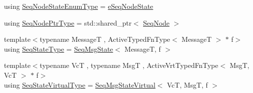 \begin{DoxyCompactItemize}
\item 
using \hyperlink{namespacevt_1_1seq_afe6bbf714bc77696f189e9321b981e46}{Seq\+Node\+State\+Enum\+Type} = \hyperlink{namespacevt_1_1seq_ad7b0496818667d816e00f717491d3b92}{e\+Seq\+Node\+State}
\item 
using \hyperlink{namespacevt_1_1seq_ae6a4874b585be0612aaca32ca6d2d191}{Seq\+Node\+Ptr\+Type} = std\+::shared\+\_\+ptr$<$ \hyperlink{structvt_1_1seq_1_1_seq_node}{Seq\+Node} $>$
\item 
{\footnotesize template$<$typename MessageT , Active\+Typed\+Fn\+Type$<$ Message\+T $>$ $\ast$ f$>$ }\\using \hyperlink{namespacevt_1_1seq_a61d50713160a2f94f2f2b22eb68eb12e}{Seq\+State\+Type} = \hyperlink{structvt_1_1seq_1_1_seq_msg_state}{Seq\+Msg\+State}$<$ MessageT, f $>$
\item 
{\footnotesize template$<$typename VcT , typename MsgT , Active\+Vrt\+Typed\+Fn\+Type$<$ Msg\+T, Vc\+T $>$ $\ast$ f$>$ }\\using \hyperlink{namespacevt_1_1seq_a724782ea7be9de5901b428738083ea51}{Seq\+State\+Virtual\+Type} = \hyperlink{structvt_1_1seq_1_1_seq_msg_state_virtual}{Seq\+Msg\+State\+Virtual}$<$ VcT, MsgT, f $>$
\end{DoxyCompactItemize}
